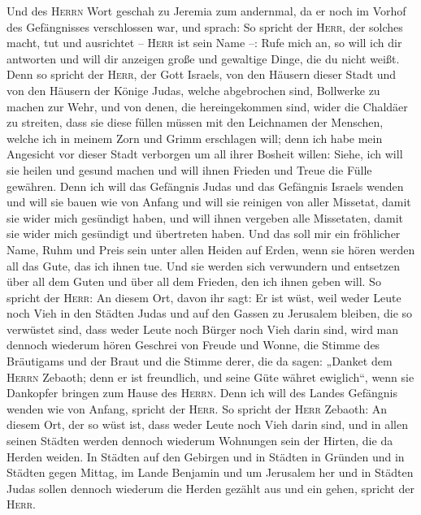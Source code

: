  Und des \textsc{Herrn} Wort geschah zu Jeremia zum
andernmal, da er noch im Vorhof des Gefängnisses verschlossen war, und
sprach:  So spricht der \textsc{Herr}, der solches macht,
tut und ausrichtet -- \textsc{Herr} ist sein Name --: 
Rufe mich an, so will ich dir antworten und will dir anzeigen große und
gewaltige Dinge, die du nicht weißt.  Denn so spricht der
\textsc{Herr}, der Gott Israels, von den Häusern dieser Stadt und von
den Häusern der Könige Judas, welche abgebrochen sind, Bollwerke zu
machen zur Wehr,  und von denen, die hereingekommen sind,
wider die Chaldäer zu streiten, dass sie diese füllen müssen mit den
Leichnamen der Menschen, welche ich in meinem Zorn und Grimm erschlagen
will; denn ich habe mein Angesicht vor dieser Stadt verborgen um all
ihrer Bosheit willen:  Siehe, ich will sie heilen und
gesund machen und will ihnen Frieden und Treue die Fülle gewähren.
 Denn ich will das Gefängnis Judas und das Gefängnis
Israels wenden und will sie bauen wie von Anfang  und will
sie reinigen von aller Missetat, damit sie wider mich gesündigt haben,
und will ihnen vergeben alle Missetaten, damit sie wider mich gesündigt
und übertreten haben.  Und das soll mir ein fröhlicher
Name, Ruhm und Preis sein unter allen Heiden auf Erden, wenn sie hören
werden all das Gute, das ich ihnen tue. Und sie werden sich verwundern
und entsetzen über all dem Guten und über all dem Frieden, den ich ihnen
geben will.  So spricht der \textsc{Herr}: An diesem Ort,
davon ihr sagt: Er ist wüst, weil weder Leute noch Vieh in den Städten
Judas und auf den Gassen zu Jerusalem bleiben, die so verwüstet sind,
dass weder Leute noch Bürger noch Vieh darin sind,  wird
man dennoch wiederum hören Geschrei von Freude und Wonne, die Stimme des
Bräutigams und der Braut und die Stimme derer, die da sagen: „Danket dem
\textsc{Herrn} Zebaoth; denn er ist freundlich, und seine Güte währet
ewiglich``, wenn sie Dankopfer bringen zum Hause des \textsc{Herrn}.
Denn ich will des Landes Gefängnis wenden wie von Anfang, spricht der
\textsc{Herr}.  So spricht der \textsc{Herr} Zebaoth: An
diesem Ort, der so wüst ist, dass weder Leute noch Vieh darin sind, und
in allen seinen Städten werden dennoch wiederum Wohnungen sein der
Hirten, die da Herden weiden.  In Städten auf den
Gebirgen und in Städten in Gründen und in Städten gegen Mittag, im Lande
Benjamin und um Jerusalem her und in Städten Judas sollen dennoch
wiederum die Herden gezählt aus und ein gehen, spricht der
\textsc{Herr}.

